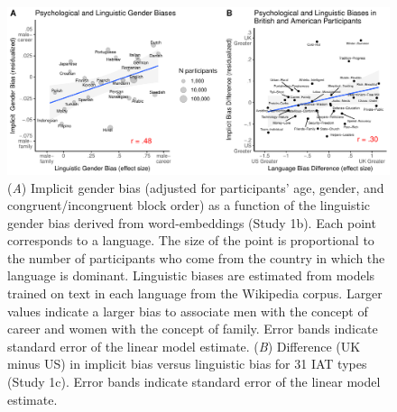 \documentclass[9pt,twocolumn,twoside,lineno]{pnas-new}
\begin{document}
\begin{figure}[t!]
\centering
\includegraphics[width=17cm]{pnas_rmd/iat_lang_pnas_files/figure-latex/study1_fig.pdf}
\caption{\label{fig:unnamed-chunk-11} ({\it A})  Implicit gender bias (adjusted for participants' age, gender, and congruent/incongruent block order) as a function of the linguistic gender bias derived from word-embeddings (Study 1b). Each point corresponds to a language. The size of the point is proportional to the number of participants who come from the country in which the language is dominant. Linguistic biases are estimated from models trained on text in each language from the Wikipedia corpus. Larger values indicate a larger bias to associate men with the concept of career and women with the concept of family. Error bands indicate standard error of the linear model estimate. ({\it B}) Difference (UK minus US) in implicit bias versus linguistic bias for 31 IAT types (Study 1c). Error bands indicate standard error of the linear model
estimate.}
\end{figure}
\end{document}

